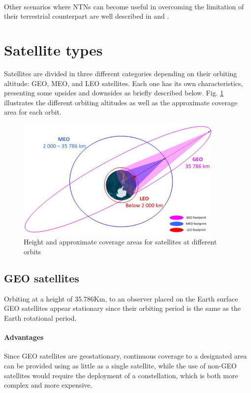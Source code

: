 \paragraph{} Other scenarios where \ac{NTNs} can become useful in overcoming the limitation of their terrestrial counterpart are well described in \cite{ntn-6g-era-challenges-giordani} and \cite{potential-multilayered-nierarchical-ntn-wang}.

\section{Satellite types}
\label{sec:satellite-types}
Satellites are divided in three different categories depending on their orbiting altitude: \ac{GEO}, \ac{MEO}, and \ac{LEO} satellites. Each one has its own characteristics, presenting some upsides and downsides as briefly described below. Fig. \ref{fig:satellite_coverages} illustrates the different orbiting altitudes as well as the approximate coverage area for each orbit.

\begin{figure}[ht]
    \centering
    \includegraphics[width=0.9\textwidth]{res/satellite-coverages.jpg}
    \caption{Height and approximate coverage areas for satellites at different orbits\cite{sustainable-sat-com-6g}}
    \label{fig:satellite_coverages}
\end{figure}

\subsection{GEO satellites}
Orbiting at a height of 35.786Km, to an observer placed on the Earth surface \ac{GEO} satellites appear stationary since their orbiting period is the same as the Earth rotational period.

\paragraph{Advantages}    
Since \ac{GEO} satellites are geostationary, continuous coverage to a designated area can be provided using as little as a single satellite, while the use of non-\ac{GEO} satellites would require the deployment of a constellation, which is both more complex and more expensive. 


